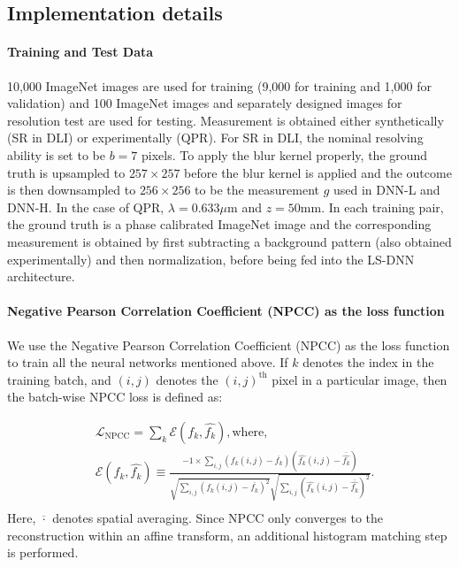 \documentclass[10pt,twocolumn,letterpaper]{article}
\begin{document}
\subsection{Implementation details}

\paragraph{Training and Test Data} 
10,000 ImageNet\cite{russakovsky2015imagenet} images are used for training (9,000 for training and 1,000 for validation) and 100 ImageNet images and separately designed images for resolution test are used for testing. Measurement is obtained either synthetically (SR in DLI) or experimentally (QPR). For SR in DLI, the nominal resolving ability is set to be $b=7$ pixels. To apply the blur kernel properly, the ground truth is upsampled to $257\times 257$ before the blur kernel is applied and the outcome is then downsampled to $256\times 256$ to be the measurement $g$ used in DNN-L and DNN-H. In the case of QPR, $\lambda=0.633\mu\text{m}$ and $z=50\text{mm}$. In each training pair, the ground truth is a phase calibrated ImageNet image and the corresponding measurement is obtained by first subtracting a background pattern (also obtained experimentally) and then normalization, before being fed into the LS-DNN architecture. 

\paragraph{Negative Pearson Correlation Coefficient (NPCC) as the loss function}
We use the Negative Pearson Correlation Coefficient (NPCC) as the loss function to train all the neural networks mentioned above. If $k$ denotes the index in the training batch, and $(i,j)$ denotes the $(i,j)^{\text{th}}$ pixel in a particular image, then the batch-wise NPCC loss is defined as: 

\begin{equation}
\begin{aligned}
&\mathscr{L}_{\text{NPCC}}=\sum_{k}\mathscr{E}(f_{k},\hat{f_{k}}),\text{where},\\ 
&\mathscr{E}(f_{k},\hat{f_{k}})\equiv
\frac {-1\times\sum_{i,j}(f_{k}(i,j)-\overline{f_{k}})(\hat{f_{k}}(i,j)-\overline{\hat{f_{k}}})}{\sqrt{\sum_{i,j}(f_{k}(i,j)-\overline{f_k})^2}\sqrt{\sum_{i,j}(\hat{f_{k}}(i,j)-\overline{\hat{f_{k}}})^2}}.\\
\end{aligned}
\end{equation}
Here, $\overline{\cdot}$ denotes spatial averaging. Since NPCC only converges to the reconstruction within an affine transform, an additional histogram matching step \cite{li2018spectral} is performed.
\end{document}
